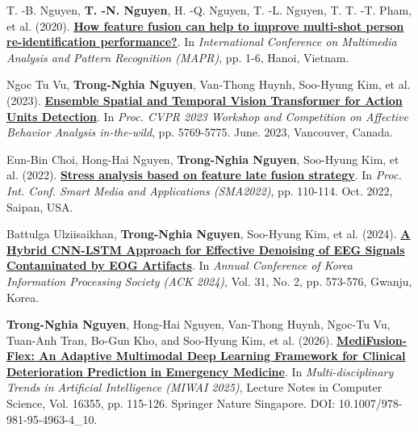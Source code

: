 \documentclass[a4paper,11pt]{article}
\begin{document}
\item[\textbf{[C.3]}] T. -B. Nguyen, \textbf{T. -N. Nguyen}, H. -Q. Nguyen, T. -L. Nguyen, T. T. -T. Pham, et al. (2020). \href{https://ieeexplore.ieee.org/document/9237782}{\textbf{How feature fusion can help to improve multi-shot person re-identification performance?}}. In \textit{International Conference on Multimedia Analysis and Pattern Recognition (MAPR)}, pp. 1-6, Hanoi, Vietnam. %

\item[\textbf{[C.4]}] Ngoc Tu Vu, \textbf{Trong-Nghia Nguyen}, Van-Thong Huynh, Soo-Hyung Kim, et al. (2023). \href{https://ieeexplore.ieee.org/document/10208411}{\textbf{Ensemble Spatial and Temporal Vision Transformer for Action Units Detection}}. In \textit{Proc. CVPR 2023 Workshop and Competition on Affective Behavior Analysis in-the-wild}, pp. 5769-5775. June. 2023, Vancouver, Canada. %

\item[\textbf{[C.5]}] Eun-Bin Choi, Hong-Hai Nguyen, \textbf{Trong-Nghia Nguyen}, Soo-Hyung Kim, et al. (2022). \href{https://manuscriptlink-society-file.s3-ap-northeast-1.amazonaws.com/kism/conference/sma2022fall/abs/0023F.pdf}{\textbf{Stress analysis based on feature late fusion strategy}}. In \textit{Proc. Int. Conf. Smart Media and Applications (SMA2022)}, pp. 110-114. Oct. 2022, Saipan, USA. 

\item[\textbf{[C.6]}] Battulga Ulziisaikhan, \textbf{Trong-Nghia Nguyen}, Soo-Hyung Kim, et al. (2024). \href{https://www.manuscriptlink.com/society/kips/conference/ack2024/programBook/presentation/pdf/oral/KIPS_C2024B0140}{\textbf{A Hybrid CNN-LSTM Approach for Effective Denoising of
EEG Signals Contaminated by EOG Artifacts}}. In \textit{Annual Conference of Korea Information Processing Society (ACK 2024)}, Vol. 31, No. 2, pp. 573-576, Gwanju, Korea.

\item[\textbf{[C.7]}] \textbf{Trong-Nghia Nguyen}, Hong-Hai Nguyen, Van-Thong Huynh, Ngoc-Tu Vu, Tuan-Anh Tran, Bo-Gun Kho, and Soo-Hyung Kim, et al. (2026). \href{https://link.springer.com/chapter/10.1007/978-981-95-4963-4_10}{\textbf{MediFusion-Flex: An Adaptive Multimodal Deep Learning Framework for Clinical Deterioration Prediction in Emergency Medicine}}. In \textit{Multi-disciplinary Trends in Artificial Intelligence (MIWAI 2025)}, Lecture Notes in Computer Science, Vol. 16355, pp. 115-126. Springer Nature Singapore. DOI: 10.1007/978-981-95-4963-4\_10.
\end{document}
